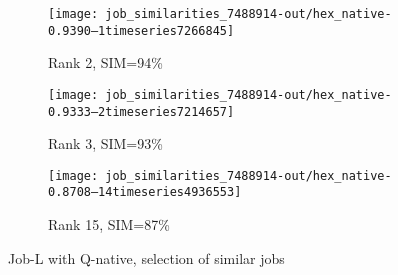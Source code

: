 \documentclass{jhps}
\begin{document}
%
%


\begin{figure}[bt]
\begin{subfigure}{0.47\textwidth}
\centering
\texttt{[image: job\_similarities\_7488914-out/hex\_native-0.9390--1timeseries7266845]}
\caption{Rank 2, SIM=94\%}
\end{subfigure}
\begin{subfigure}{0.47\textwidth}
\centering
\texttt{[image: job\_similarities\_7488914-out/hex\_native-0.9333--2timeseries7214657]}
\caption{Rank 3, SIM=93\%}
\end{subfigure}
\begin{subfigure}{0.47\textwidth}
\texttt{[image: job\_similarities\_7488914-out/hex\_native-0.8708--14timeseries4936553]}
\caption{Rank 15, SIM=87\%}
\end{subfigure}

\caption{Job-L with Q-native, selection of similar jobs}%
\label{fig:job-L-hex-native}
\end{figure}
\end{document}
